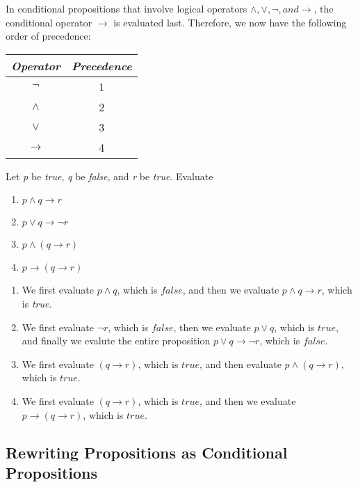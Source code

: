 In conditional propositions that involve logical operators $\land, \vee, \lnot, and \rightarrow$, the conditional operator $\rightarrow$ is evaluated last.  Therefore, we now have the following order of precedence:

\begin{table}[h]
\centering
\begin{tabular}{|c|c|}
\hline
\textit{Operator} & \textit{Precedence} \\ \hline
$\lnot$           & 1                   \\ \hline
$\land$           & 2                   \\ \hline
$\vee$            & 3                   \\ \hline
$\rightarrow$     & 4                   \\ \hline
\end{tabular}
\end{table}

Let \textit{p} be \textit{true}, \textit{q} be \textit{false}, and \textit{r} be \textit{true}.  Evaluate

\begin{enumerate}[label=(\alph*)]
\item $p \land q \rightarrow r$
\item $p \vee q \rightarrow \lnot r$
\item $p \land (q \rightarrow r)$
\item $p \rightarrow (q \rightarrow r)$
\end{enumerate}

\begin{enumerate}[label=(\alph*)]
\item We first evaluate $p \land q$, which is $false$, and then we evaluate $p \land q \rightarrow r$, which is \textit{true}.
\item We first evaluate $\lnot r$, which is $false$, then we evaluate $p \vee q$, which is $true$, and finally we evalute the entire proposition $p \vee q \rightarrow \lnot r$, which is $false$.
\item We first evaluate $(q \rightarrow r)$, which is $true$, and then evaluate $p \land (q \rightarrow r)$, which is $true$.
\item We first evaluate $(q \rightarrow r)$, which is $true$, and then we evaluate $p \rightarrow (q \rightarrow r)$, which is $true$.
\end{enumerate}

\subsection*{Rewriting Propositions as Conditional Propositions}

